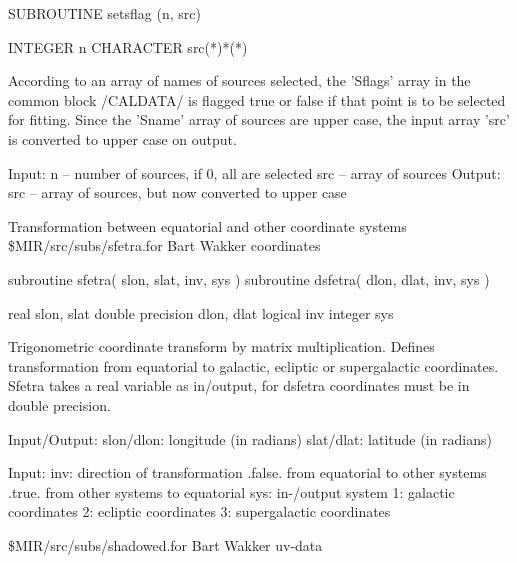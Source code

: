 \par{\tenpoint
{\eightpoint\begintt
        SUBROUTINE setsflag (n, src)

        INTEGER    n
        CHARACTER  src(*)*(*)

  According to an array of names of sources selected, the 'Sflags'
  array in the common block /CALDATA/ is flagged true or false if
  that point is to be selected for fitting.
  Since the 'Sname' array of sources are upper case, the input array
  'src' is converted to upper case on output.

  Input:
       n    -- number of sources, if 0, all are selected
       src  -- array of sources
  Output:
       src  -- array of sources, but now converted to upper case
\endtt}
\par}
%
\noindent Transformation between equatorial and other coordinate systems
\newline \ 
\newline {} \$MIR/src/subs/sfetra.for
\newline {} Bart Wakker
\newline {} coordinates
\par{\tenpoint
{\eightpoint\begintt
      subroutine sfetra( slon, slat, inv, sys )
      subroutine dsfetra( dlon, dlat, inv, sys )

      real                 slon, slat
      double precision     dlon, dlat
      logical              inv
      integer              sys

 Trigonometric coordinate transform by matrix multiplication. Defines
 transformation from equatorial to galactic, ecliptic or supergalactic
 coordinates.
 Sfetra takes a real variable as in/output, for dsfetra coordinates
 must be in double precision.

 Input/Output:
   slon/dlon:   longitude (in radians)
   slat/dlat:   latitude  (in radians)

 Input:
   inv:         direction of transformation
                .false. from equatorial to other systems
                .true.  from other systems to equatorial
   sys:         in-/output system
                1: galactic coordinates
                2: ecliptic coordinates
                3: supergalactic coordinates
\endtt}
\par}
%
\newline {} \$MIR/src/subs/shadowed.for
\newline {} Bart Wakker
\newline {} uv-data
